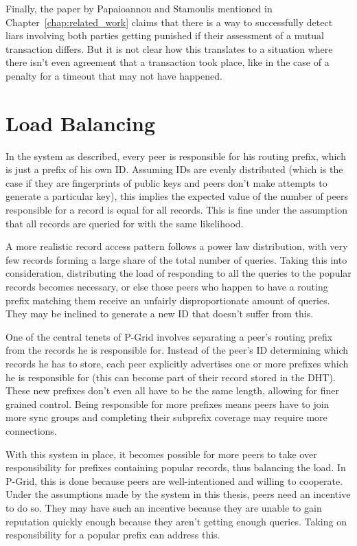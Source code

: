 Finally, the paper by Papaioannou and Stamoulis\cite{papaioannou2005optimizing}
mentioned in Chapter~\ref{chap:related_work} claims that there is a way to
successfully detect liars involving both parties getting punished if their
assessment of a mutual transaction differs. But it is not clear how this
translates to a situation where there isn't even agreement that a transaction
took place, like in the case of a penalty for a timeout that may not have
happened.

\section{Load Balancing}
\label{sec:desc_load_balancing}
In the system as described, every peer is responsible for his routing prefix,
which is just a prefix of his own ID. Assuming IDs are evenly distributed (which
is the case if they are fingerprints of public keys and peers don't make
attempts to generate a particular key), this implies the expected value of the
number of peers responsible for a record is equal for all records. This is fine
under the assumption that all records are queried for with the same likelihood.

A more realistic record access pattern follows a power law distribution, with
very few records forming a large share of the total number of queries. Taking
this into consideration, distributing the load of responding to all the queries
to the popular records becomes necessary, or else those peers who happen to have
a routing prefix matching them receive an unfairly disproportionate amount of
queries. They may be inclined to generate a new ID that doesn't suffer from
this.

One of the central tenets of P-Grid involves separating a peer's routing prefix
from the records he is responsible for. Instead of the peer's ID determining
which records he has to store, each peer explicitly advertises one or more
prefixes which he is responsible for (this can become part of their record
stored in the \ac{DHT}). These new prefixes don't even all have to be the same
length, allowing for finer grained control. Being responsible for more prefixes
means peers have to join more sync groups and completing their subprefix
coverage may require more connections.

With this system in place, it becomes possible for more peers to take over
responsibility for prefixes containing popular records, thus balancing the load.
In P-Grid, this is done because peers are well-intentioned and willing to
cooperate. Under the assumptions made by the system in this thesis, peers need
an incentive to do so. They may have such an incentive because they are unable
to gain reputation quickly enough because they aren't getting enough queries.
Taking on responsibility for a popular prefix can address this.

